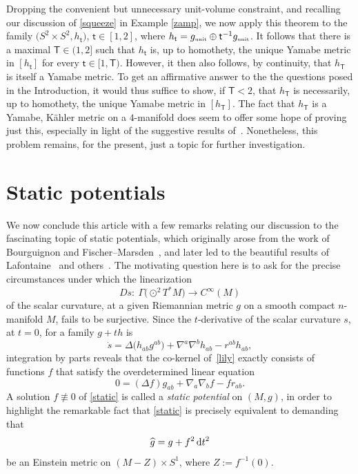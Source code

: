 \documentclass[pdftex]{sigma}
\numberwithin{equation}{section}
\begin{document}
Dropping the convenient but unnecessary unit-volume constraint, and recalling our discussion of \eqref{squeeze} in Example \ref{zamp}, we now apply this theorem to
the family $\big(S^2 \times S^2, h_{\mathsf{t}}\big)$, $\mathsf{t}\in [1,2]$, where $h_{\mathsf{t}}
=g_{\text{\tiny unit}}\oplus \mathsf{t}^{-1} g_{\text{\tiny unit}}$.
It follows that there is a maximal $\mathsf{T} \in (1,2]$
such that
$h_{\mathsf{t}}$ is, up to homothety,
the {unique} Yamabe metric in $[h_{\mathsf{t}}]$ for every $\mathsf{t}\in [1,\mathsf{T})$. However, it then also follows, by continuity, that
$h_{\mathsf{T}}$ is itself a Yamabe metric. To get an affirmative answer to the
the questions posed in the Introduction, it would thus suffice to show, if $\mathsf{T} < 2$, that $h_{\mathsf{T}}$ is necessarily, up to homothety,
the {\sf unique} Yamabe metric in $[h_{\mathsf{T}}]$. The fact that $h_{\mathsf{T}}$ is a Yamabe, K\"ahler metric on a $4$-manifold does seem to offer some hope of proving just this,
especially in light of the suggestive results of~\cite{gursky, gl1}. Nonetheless, this problem remains, for the present, just a topic for further investigation.

\section{Static potentials}

We now conclude this article with a few remarks relating our discussion to the fascinating topic of static potentials, which originally arose
from the work of Bourguignon \cite{bourguignon} and Fischer--Marsden~\cite{fischer-marsden}, and later led to the beautiful results
of Lafontaine~\cite{lafontaine} and others~\cite{ambrozio,corvino,seshadri}.
The motivating question here is to ask for the precise circumstances under which the linearization
\begin{equation}\label{lily}
Ds\colon \ \Gamma \big({\odot}^2 T^*M\big)\to C^{\infty}(M)
\end{equation}
 of the scalar curvature, at a given Riemannian metric $g$ on a smooth compact $n$-manifold $M$,
 fails to be surjective. Since the $t$-derivative of the scalar curvature $s$, at $t=0$, for a family
 $g+ t h$ is
 \begin{equation*}
\dot{s}=\Delta \big(h_{ab}g^{ab}\big) + \nabla^a\nabla^bh_{ab} - r^{ab}h_{ab},
\end{equation*}
integration by parts reveals that
the co-kernel of~\eqref{lily} exactly consists of functions $f$ that satisfy the overdetermined linear equation
 \begin{equation}\label{static}
0= (\Delta f)g_{ab} + \nabla_a \nabla_b f - fr_{ab}.
\end{equation}
A solution $f\not\equiv 0$ of \eqref{static} is called a {\em static potential}
on $(M,g)$, in order to highlight the remarkable fact \cite[Corollary~9.107, with $p=1$, $\hat{\lambda}=0$]{bes} that
\eqref{static} is precisely equivalent to demanding that
\begin{equation}\label{warp}
\widehat{g}=g+f^2 \,{\rm d}t^2
\end{equation}
 be an Einstein metric on $(M-Z) \times S^1$, where $Z:=f^{-1}(0)$.
\end{document}
